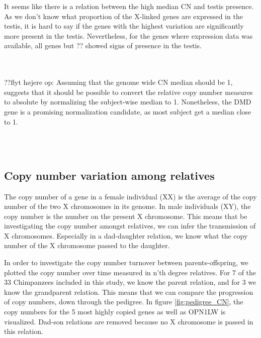 \noindent It seems like there is a relation between the high median CN and testis presence. As we don't know what proportion of the X-linked genes are expressed in the testis, it is hard to say if the genes with the highest variation are significantly more present in the testis. Nevertheless, for the genes where expression data was available, all genes but ?? showed signs of presence in the testis.




\\
\\
\noindent ??flyt højere op: Assuming that the genome wide CN median should be 1, suggests that it should be possible to convert the relative copy number measures to absolute by normalizing the subject-wise median to 1. Nonetheless, the DMD gene is a promising normalization candidate, as most subject get a median close to 1.

\\
\\
\subsection*{Copy number variation among relatives}
The copy number of a gene in a female individual (XX) is the average of the copy number of the two X chromosomes in its genome. In male individuals (XY), the copy number is the number on the present X chromosome. This means that be investigating the copy number amongst relatives, we can infer the transmission of X chromosomes. Especially in a dad-daughter relation, we know what the copy number of the X chromosome passed to the daughter.

In order to investigate the copy number turnover between parents-offspring, we plotted the copy number over time measured in n'th degree relatives. For 7 of the 33 Chimpanzees included in this study, we know the parent relation, and for 3 we know the grandparent relation. This means that we can compare the progression of copy numbers, down through the pedigree. In figure \ref{fig:pedigree_CN}, the copy numbers for the 5 most highly copied genes as well as OPN1LW is visualized. Dad-son relations are removed because no X chromosome is passed in this relation.

